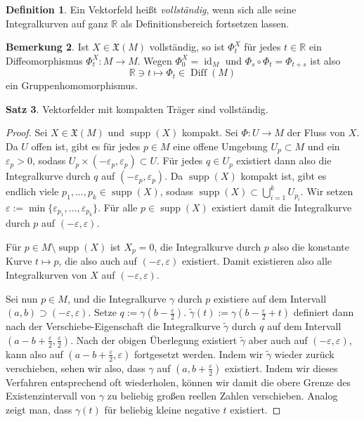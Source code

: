 \documentclass[a4paper]{scrbook}
\numberwithin{equation}{chapter}
\DeclareMathOperator{\id}{id}
\DeclareMathOperator{\Diff}{Diff}
\DeclareMathOperator{\supp}{supp}
\newcommand{\R}{\mathbb{R}}
\theoremstyle{definition}
\newtheorem{defn}{Definition}[section]
\newtheorem{satz}[defn]{Satz}
\newtheorem{bem}[defn]{Bemerkung}
\begin{document}
\begin{defn}
	Ein Vektorfeld heißt \emph{vollständig}, wenn sich alle seine Integralkurven auf ganz $\R$ als Definitionsbereich fortsetzen lassen.
\end{defn}
\begin{bem}
	Ist $X\in\mathfrak X(M)$ vollständig, so ist $\Phi^X_t$ für jedes $t\in\R$ ein Diffeomorphismus $\Phi^X_t\colon M\to M$. Wegen $\Phi^X_0 = \id_M$ und $\Phi_s\circ\Phi_t = \Phi_{t+s}$ ist also
	\[\R \ni t \mapsto \Phi_t \in \Diff(M)\]
	ein Gruppenhomomorphismus.
\end{bem}
\begin{satz}
	Vektorfelder mit kompakten Träger sind vollständig.
	
	\begin{proof}
		Sei $X \in \mathfrak X(M)$ und $\supp(X)$ kompakt. Sei $\Phi\colon U\to M$ der Fluss von $X$. Da $U$ offen ist, gibt es für jedes $p\in M$ eine offene Umgebung $U_p \subset M$ und ein $\varepsilon_p > 0$, sodass $U_p \times (-\varepsilon_p, \varepsilon_p) \subset U$. Für jedes $q \in U_p$ existiert dann also die Integralkurve durch $q$ auf $(-\varepsilon_p,\varepsilon_p)$. Da $\supp(X)$ kompakt ist, gibt es endlich viele $p_1,\dots,p_k \in \supp(X)$, sodass $\supp(X) \subset \bigcup_{i=1}^k U_{p_i}$. Wir setzen $\varepsilon := \min\{\varepsilon_{p_1}, \dots, \varepsilon_{p_k}\}$. Für alle $p \in \supp(X)$ existiert damit die Integralkurve durch $p$ auf $(-\varepsilon, \varepsilon)$.

		Für $p \in M \setminus \supp(X)$ ist $X_p = 0$, die Integralkurve durch $p$ also die konstante Kurve $t \mapsto p$, die also auch auf $(-\varepsilon, \varepsilon)$ existiert. Damit existieren also alle Integralkurven von $X$ auf $(-\varepsilon, \varepsilon)$.

		Sei nun $p\in M$, und die Integralkurve $\gamma$ durch $p$ existiere auf dem Intervall $(a,b) \supset (-\varepsilon,\varepsilon)$. Setze $q := \gamma(b - \frac{\varepsilon}{2})$. $\tilde\gamma(t) := \gamma(b - \frac{\varepsilon}{2} + t)$ definiert dann nach der Verschiebe-Eigenschaft die Integralkurve $\tilde\gamma$ durch $q$ auf dem Intervall $(a - b + \frac{\varepsilon}{2}, \frac{\varepsilon}{2})$. Nach der obigen Überlegung existiert $\tilde\gamma$ aber auch auf $(-\varepsilon, \varepsilon)$, kann also auf $(a - b + \frac{\varepsilon}{2}, \varepsilon)$ fortgesetzt werden. Indem wir $\tilde\gamma$ wieder zurück verschieben, sehen wir also, dass $\gamma$ auf $(a,b+\frac{\varepsilon}{2})$ existiert. Indem wir dieses Verfahren entsprechend oft wiederholen, können wir damit die obere Grenze des Existenzintervall von $\gamma$ zu beliebig großen reellen Zahlen verschieben. Analog zeigt man, dass $\gamma(t)$ für beliebig kleine negative $t$ existiert.
	\end{proof}
\end{satz}
\end{document}
